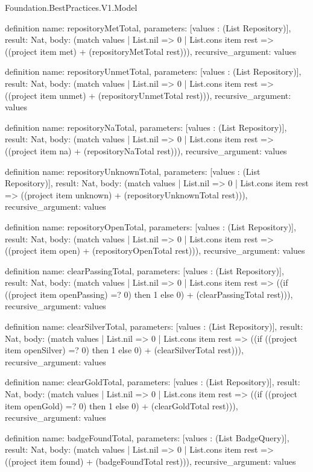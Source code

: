 \begin{lexlean}{Foundation.BestPractices.V1.Model}
\begin{semanticmodule}
definition{
  name: repositoryMetTotal,
  parameters: [values : (List Repository)],
  result: Nat,
  body: (match values
    | List.nil => 0
    | List.cons item rest => ((project item met) + (repositoryMetTotal rest))),
  recursive_argument: values
}

definition{
  name: repositoryUnmetTotal,
  parameters: [values : (List Repository)],
  result: Nat,
  body: (match values
    | List.nil => 0
    | List.cons item rest => ((project item unmet) + (repositoryUnmetTotal rest))),
  recursive_argument: values
}

definition{
  name: repositoryNaTotal,
  parameters: [values : (List Repository)],
  result: Nat,
  body: (match values
    | List.nil => 0
    | List.cons item rest => ((project item na) + (repositoryNaTotal rest))),
  recursive_argument: values
}

definition{
  name: repositoryUnknownTotal,
  parameters: [values : (List Repository)],
  result: Nat,
  body: (match values
    | List.nil => 0
    | List.cons item rest => ((project item unknown) + (repositoryUnknownTotal rest))),
  recursive_argument: values
}

definition{
  name: repositoryOpenTotal,
  parameters: [values : (List Repository)],
  result: Nat,
  body: (match values
    | List.nil => 0
    | List.cons item rest => ((project item open) + (repositoryOpenTotal rest))),
  recursive_argument: values
}

definition{
  name: clearPassingTotal,
  parameters: [values : (List Repository)],
  result: Nat,
  body: (match values
    | List.nil => 0
    | List.cons item rest => ((if ((project item openPassing) =? 0) then 1 else 0) + (clearPassingTotal rest))),
  recursive_argument: values
}

definition{
  name: clearSilverTotal,
  parameters: [values : (List Repository)],
  result: Nat,
  body: (match values
    | List.nil => 0
    | List.cons item rest => ((if ((project item openSilver) =? 0) then 1 else 0) + (clearSilverTotal rest))),
  recursive_argument: values
}

definition{
  name: clearGoldTotal,
  parameters: [values : (List Repository)],
  result: Nat,
  body: (match values
    | List.nil => 0
    | List.cons item rest => ((if ((project item openGold) =? 0) then 1 else 0) + (clearGoldTotal rest))),
  recursive_argument: values
}

definition{
  name: badgeFoundTotal,
  parameters: [values : (List BadgeQuery)],
  result: Nat,
  body: (match values
    | List.nil => 0
    | List.cons item rest => ((project item found) + (badgeFoundTotal rest))),
  recursive_argument: values
}


\end{semanticmodule}
\end{lexlean}
